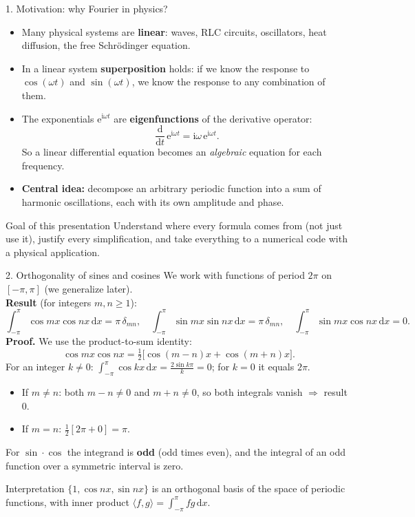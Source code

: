 \documentclass[aspectratio=169,10pt]{beamer}
\newcommand{\ii}{\mathrm{i}}
\newcommand{\ee}{\mathrm{e}}
\newcommand{\dd}{\,\mathrm{d}}
\begin{document}
\begin{frame}{1. Motivation: why Fourier in physics?}
  \begin{itemize}
    \item Many physical systems are \textbf{linear}: waves, RLC circuits, oscillators, heat diffusion, the free Schr\"odinger equation.
    \item In a linear system \textbf{superposition} holds: if we know the response to $\cos(\omega t)$ and $\sin(\omega t)$, we know the response to any combination of them.
    \item The exponentials $\ee^{\ii\omega t}$ are \textbf{eigenfunctions} of the derivative operator:
    \[
      \frac{\mathrm{d}}{\mathrm{d}t}\,\ee^{\ii\omega t}=\ii\omega\,\ee^{\ii\omega t}.
    \]
    So a linear differential equation becomes an \emph{algebraic} equation for each frequency.
    \item \textbf{Central idea:} decompose an arbitrary periodic function into a sum of harmonic oscillations, each with its own amplitude and phase.
  \end{itemize}
  \begin{keybox}{Goal of this presentation}
    Understand where every formula comes from (not just use it), justify every simplification, and take everything to a numerical code with a physical application.
  \end{keybox}
\end{frame}

\begin{frame}{2. Orthogonality of sines and cosines}
  \small
  We work with functions of period $2\pi$ on $[-\pi,\pi]$ (we generalize later).\\[3pt]
  \textbf{Result} (for integers $m,n\ge 1$):
  \[
    \int_{-\pi}^{\pi}\!\cos mx\cos nx\dd x=\pi\,\delta_{mn},\quad
    \int_{-\pi}^{\pi}\!\sin mx\sin nx\dd x=\pi\,\delta_{mn},\quad
    \int_{-\pi}^{\pi}\!\sin mx\cos nx\dd x=0 .
  \]
  \textbf{Proof.} We use the product-to-sum identity:
  \[
    \cos mx\cos nx=\tfrac12\big[\cos (m-n)x+\cos (m+n)x\big].
  \]
  For an integer $k\neq 0$:
  $\displaystyle\int_{-\pi}^{\pi}\cos kx\dd x=\frac{2\sin k\pi}{k}=0$; for $k=0$ it equals $2\pi$.
  \begin{itemize}
    \item If $m\neq n$: both $m-n\neq0$ and $m+n\neq 0$, so both integrals vanish $\Rightarrow$ result $0$.
    \item If $m=n$: $\tfrac12[2\pi+0]=\pi$.
  \end{itemize}
  For $\sin\cdot\cos$ the integrand is \textbf{odd} (odd times even), and the integral of an odd function over a symmetric interval is zero.
  \begin{keybox}{Interpretation}
    $\{1,\cos nx,\sin nx\}$ is an orthogonal basis of the space of periodic functions, with inner product $\langle f,g\rangle=\int_{-\pi}^{\pi}f g\dd x$.
  \end{keybox}
\end{frame}
\end{document}
